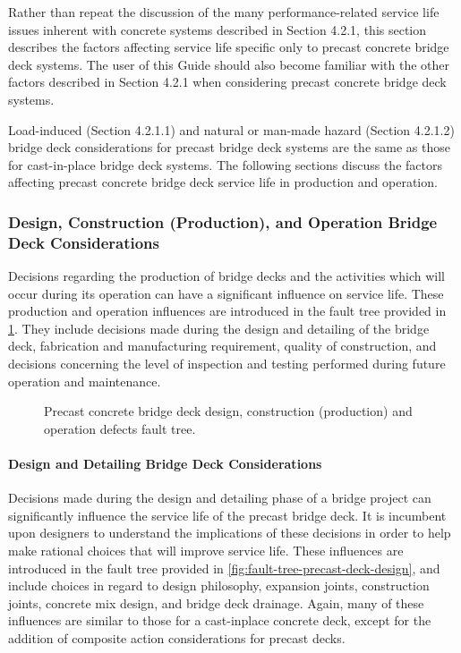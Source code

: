 Rather than repeat the discussion of the many performance-related service life issues inherent with concrete
systems described in Section 4.2.1, this section describes the factors affecting service life specific only to precast
concrete bridge deck systems. The user of this Guide should also become familiar with the other factors described in
Section 4.2.1 when considering precast concrete bridge deck systems.

Load-induced (Section 4.2.1.1) and natural or man-made hazard (Section 4.2.1.2) bridge deck considerations for
precast bridge deck systems are the same as those for cast-in-place bridge deck systems. The following sections
discuss the factors affecting precast concrete bridge deck service life in production and operation.

\subsubsection{Design, Construction (Production), and Operation Bridge Deck Considerations}
Decisions regarding the production of bridge decks and the activities which will occur during its operation can
have a significant influence on service life. These production and operation influences are introduced in the fault tree
provided in \cref{fig:fault-tree-precast-deck-operation}. They include decisions made during the design and detailing of the bridge deck, fabrication
and manufacturing requirement, quality of construction, and decisions concerning the level of inspection and testing
performed during future operation and maintenance.

\begin{figure}
  \caption{Precast concrete bridge deck design, construction (production) and operation defects fault tree.}
  \label{fig:fault-tree-precast-deck-operation}
\end{figure}

\paragraph{Design and Detailing Bridge Deck Considerations}
Decisions made during the design and detailing phase of a bridge project can significantly influence the service
life of the precast bridge deck. It is incumbent upon designers to understand the implications of these decisions in
order to help make rational choices that will improve service life. These influences are introduced in the fault tree
provided in \cref{fig:fault-tree-precast-deck-design}, and include choices in regard to design philosophy, expansion joints, construction joints,
concrete mix design, and bridge deck drainage. Again, many of these influences are similar to those for a cast-inplace
concrete deck, except for the addition of composite action considerations for precast decks.

